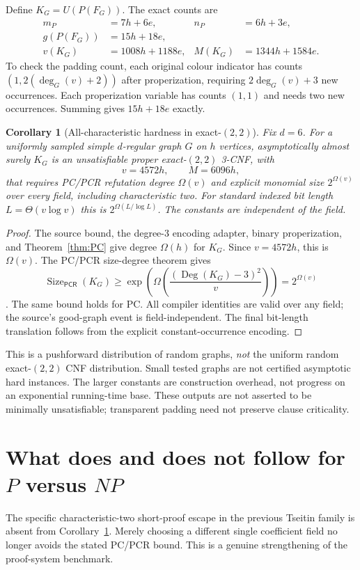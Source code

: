 \documentclass[11pt]{article}
\newtheorem{corollary}[theorem]{Corollary}
\newcommand{\PCR}{\mathsf{PCR}}
\newcommand{\Deg}{\operatorname{Deg}}
\newcommand{\Size}{\operatorname{Size}}
\begin{document}
Define $K_G=U(P(F_G))$. The exact counts are
\begin{align*}
m_P&=7h+6e, & n_P&=6h+3e,\\
g(P(F_G))&=15h+18e,\\
v(K_G)&=1008h+1188e, & M(K_G)&=1344h+1584e.
\end{align*}
To check the padding count, each original colour indicator has counts
$(1,2(\deg_G(v)+2))$ after properization, requiring $2\deg_G(v)+3$
new occurrences. Each properization variable has counts $(1,1)$ and needs
two new occurrences. Summing gives $15h+18e$ exactly.

\begin{corollary}[All-characteristic hardness in exact-$(2,2)$]\label{cor:all}
Fix $d=6$. For a uniformly sampled simple $d$-regular graph $G$ on $h$ vertices,
asymptotically almost surely $K_G$ is an unsatisfiable proper exact-$(2,2)$ 3-CNF,
with
\[
v=4572h,\qquad M=6096h,
\]
that requires PC/PCR refutation degree $\Omega(v)$ and explicit monomial
size $2^{\Omega(v)}$ over every field, including characteristic two.
For standard indexed bit length $L=\Theta(v\log v)$ this is
$2^{\Omega(L/\log L)}$. The constants are independent of the field.
\end{corollary}
\begin{proof}
The source bound, the degree-3 encoding adapter, binary properization, and
Theorem~\ref{thm:PC} give degree $\Omega(h)$ for $K_G$. Since $v=4572h$,
this is $\Omega(v)$. The PC/PCR size-degree theorem gives
\[
 \Size_{\PCR}(K_G)\ge
 \exp\!\left(\Omega\!\left(\frac{(\Deg(K_G)-3)^2}{v}\right)\right)
 =2^{\Omega(v)}
\]
\cite{MN2015}. The same bound holds for PC. All compiler identities are valid
over any field; the source's good-graph event is field-independent. The final
bit-length translation follows from the explicit constant-occurrence encoding.
\end{proof}

This is a pushforward distribution of random graphs, \emph{not} the uniform
random exact-$(2,2)$ CNF distribution. Small tested graphs are not certified
asymptotic hard instances. The larger constants are construction overhead,
not progress on an exponential running-time base. These outputs are not
asserted to be minimally unsatisfiable; transparent padding need not preserve
clause criticality.

\section{What does and does not follow for $P$ versus $NP$}
The specific characteristic-two short-proof escape in the previous Tseitin
family is absent from Corollary~\ref{cor:all}. Merely choosing a different
single coefficient field no longer avoids the stated PC/PCR bound.
This is a genuine strengthening of the proof-system benchmark.
\end{document}
